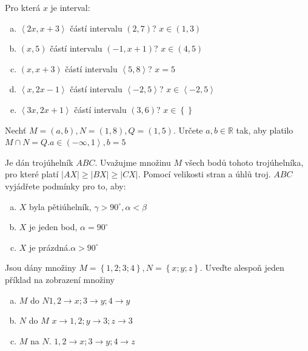 \begin{example}[SÚM 173/34]
  Pro která $x$ je interval:
  \begin{enumerate}[a.]
    \item $\left<2x,x+3\right>$ částí intervalu $(2,7)$? \hfill $x \in (1,3)$
    \item $(x,5)$ částí intervalu $\left(-1,x+1\right)$? \hfill $x\in (4,5)$
    \item $(x,x+3)$ částí intervalu $\left<5,8\right>$? \hfill $x=5$
    \item $\left<x,2x-1\right>$ částí intervalu $\left<-2,5\right>$? \hfill $x\in\left<-2,5\right>$
    \item $\left<3x,2x+1\right>$ částí intervalu $(3,6)$? \hfill $x\in \left\{\right\}$
  \end{enumerate}
\end{example}

\begin{example}[SÚM 173/35]
  Nechť $M = (a,b), N = (1,8), Q = (1,5)$. Určete $a,b \in \mathbb{R}$ tak, aby platilo $M\cap N = Q$.\hfill $a\in \left(-\infty, 1\right>, b=5$
\end{example}

\begin{example}[SÚM 173/37*]
  Je dán trojúhelník $ABC$. Uvažujme množinu $M$ všech bodů tohoto trojúhelníka, pro které platí $|AX| \geq |BX| \geq |CX|.$ Pomocí velikosti stran a úhlů troj. $ABC$ vyjádřete podmínky pro to, aby:
  \begin{enumerate}[a.]
    \item $X$ byla pětiúhelník, \hfill $\gamma > 90^\circ, \alpha < \beta$
    \item $X$  je jeden bod, \hfill $\alpha = 90^\circ$
    \item $X$ je prázdná.\hfill $\alpha > 90^\circ$
  \end{enumerate}
\end{example}


\begin{example}[SÚM 174/42]
  Jsou dány množiny $M=\left\{1,2; 3; 4\right\},N=\left\{x;y;z\right\}.$ Uveďte alespoň jeden příklad na zobrazení množiny
  \begin{enumerate}[a.]
    \item $M$ do $N$\hfill $1,2\rightarrow x; 3\rightarrow y; 4 \rightarrow y$
    \item $N$ do $M$ \hfill $x\rightarrow 1,2; y\rightarrow 3; z\rightarrow 3$
    \item $M$ na $N.$ \hfill $1,2\rightarrow x; 3 \rightarrow y; 4 \rightarrow z$
  \end{enumerate}
\end{example}

